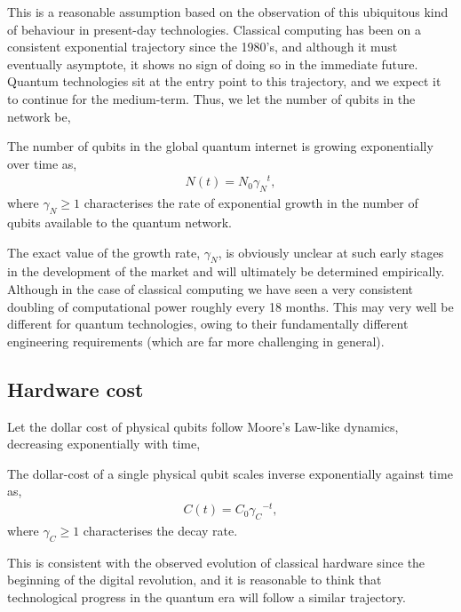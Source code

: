This is a reasonable assumption based on the observation of this ubiquitous kind of behaviour in present-day technologies. Classical computing has been on a consistent exponential trajectory since the 1980's, and although it must eventually asymptote, it shows no sign of doing so in the immediate future. Quantum technologies sit at the entry point to this trajectory, and we expect it to continue for the medium-term. Thus, we let the number of qubits in the network be,
\begin{postulate}\label{post:net_growth}
The number of qubits in the global quantum internet is growing exponentially over time as,
\begin{align}
	N(t) = N_0 {\gamma_N}^{t},
\end{align}
where \mbox{$\gamma_N\geq 1$} characterises the rate of exponential growth in the number of qubits available to the quantum network.
\end{postulate}

The exact value of the growth rate, $\gamma_N$, is obviously unclear at such early stages in the development of the market and will ultimately be determined empirically. Although in the case of classical computing we have seen a very consistent doubling of computational power roughly every 18 months. This may very well be different for quantum technologies, owing to their fundamentally different engineering requirements (which are far more challenging in general).

%
%

\subsection{Hardware cost} 

Let the dollar cost of physical qubits follow Moore's Law-like dynamics, decreasing exponentially with time,
\begin{postulate}\label{post:hardware_cost}
The dollar-cost of a single physical qubit scales inverse exponentially against time as,
\begin{align}
	C(t) = C_0 {\gamma_C}^{-t},
\end{align}
where \mbox{$\gamma_C\geq 1$} characterises the decay rate.
\end{postulate}

This is consistent with the observed evolution of classical hardware since the beginning of the digital revolution, and it is reasonable to think that technological progress in the quantum era will follow a similar trajectory.

